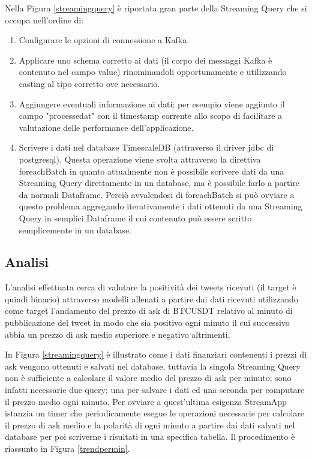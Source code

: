 Nella Figura \ref{streamingquery} è riportata gran parte della Streaming Query che si occupa
nell'ordine di:
\begin{enumerate}
    \item Configurare le opzioni di connessione a Kafka.
    \item Applicare uno schema corretto ai dati (il corpo dei messaggi Kafka è contenuto nel campo
    value) rinominandoli opportunamente e utilizzando casting al tipo corretto ove necessario.
    \item Aggiungere eventuali informazione ai dati; per esempio viene aggiunto il campo
    "processedat" con il timestamp corrente allo scopo di facilitare a valutazione delle performance
    dell'applicazione.
    \item Scrivere i dati nel database TimescaleDB (attraverso il driver jdbc di postgresql). Questa
    operazione viene svolta attraverso la direttiva foreachBatch in quanto attualmente non è
    possibile scrivere dati da una Streaming Query direttamente in un database, ma è possibile farlo a
    partire da normali Dataframe. Perciò avvalendosi di foreachBatch si può ovviare a questo
    problema aggregando iterativamente i dati ottenuti da una Streaming Query in semplici Dataframe
    il cui contenuto può essere scritto semplicemente in un database.

\end{enumerate}

\subsection{Analisi}

L'analisi effettuata cerca di valutare la positività dei tweets ricevuti (il target è quindi
binario) attraverso modelli allenati a partire dai dati ricevuti utilizzando come target
l'andamento del prezzo di ask di BTCUSDT relativo al minuto di pubblicazione del tweet in modo
che sia positivo ogni minuto il cui successivo abbia un prezzo di ask medio superiore e
negativo altrimenti.

In Figura \ref{streamingquery} è illustrato come i dati finanziari contenenti i prezzi di ask
vengono ottenuti e salvati nel database, tuttavia la singola Streaming Query non è sufficiente
a calcolare il valore medio del prezzo di ask per minuto; sono infatti necessarie due query: una
per salvare i dati ed una seconda per computare il prezzo medio ogni minuto. Per ovviare a
quest'ultima esigenza StreamApp istanzia un timer che periodicamente esegue le operazioni necessarie
per calcolare il prezzo di ask medio e la polarità di ogni minuto a partire dai
dati salvati nel database per poi scriverne i risultati in una specifica tabella. Il procedimento
è riassunto in Figura \ref{trendpermin}.

